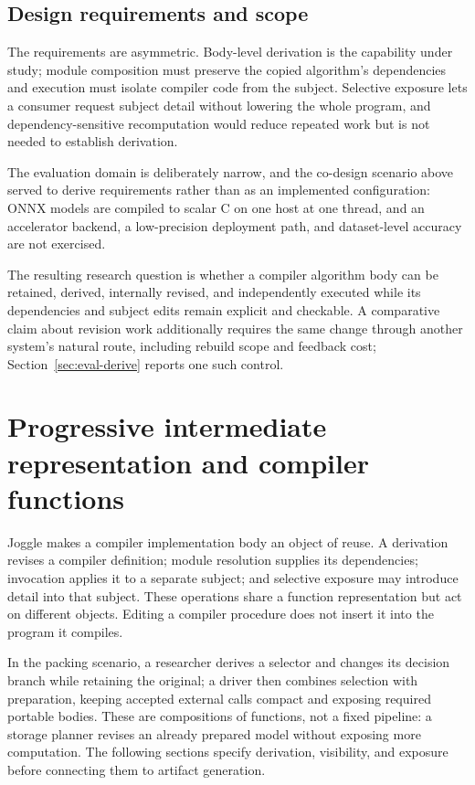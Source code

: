 \documentclass[sigplan,anonymous,review]{acmart}
\begin{document}
\subsection{Design requirements and scope}
The requirements are asymmetric. Body-level derivation is the capability under
study; module composition must preserve the copied algorithm's dependencies and
execution must isolate compiler code from the subject. Selective exposure lets a
consumer request subject detail without lowering the whole program, and
dependency-sensitive recomputation would reduce repeated work but is not needed
to establish derivation.

The evaluation domain is deliberately narrow, and the co-design scenario above
served to derive requirements rather than as an implemented configuration: ONNX
models are compiled to scalar C on one host at one thread, and an accelerator
backend, a low-precision deployment path, and dataset-level accuracy are not
exercised.

The resulting research question is whether a compiler algorithm body can be
retained, derived, internally revised, and independently executed while its
dependencies and subject edits remain explicit and checkable. A comparative
claim about revision work additionally requires the same change through
another system's natural route, including rebuild scope and feedback cost;
Section~\ref{sec:eval-derive} reports one such control.

\section{Progressive intermediate representation and compiler functions}
Joggle makes a compiler implementation body an object of reuse. A derivation
revises a compiler definition; module resolution supplies its dependencies;
invocation applies it to a separate subject; and selective exposure may
introduce detail into that subject. These operations share a function
representation but act on different objects. Editing a compiler procedure
does not insert it into the program it compiles.

In the packing scenario, a researcher derives a selector and changes its
decision branch while retaining the original; a driver then combines
selection with preparation, keeping accepted external calls compact and
exposing required portable bodies. These are compositions of functions, not
a fixed pipeline: a storage planner revises an already prepared model without
exposing more computation. The following sections specify derivation,
visibility, and exposure before connecting them to artifact generation.
\end{document}
